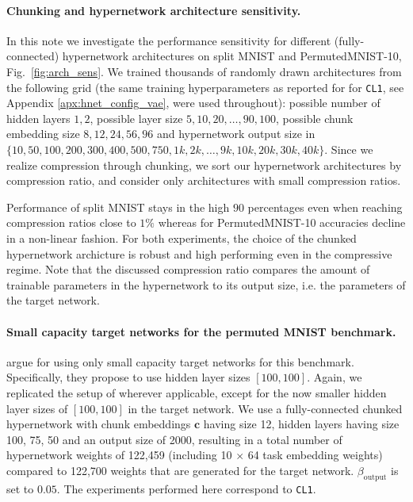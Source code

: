 \documentclass{article}
\begin{document}
\paragraph{Chunking and hypernetwork architecture sensitivity.} 
In this note we investigate the performance sensitivity for different (fully-connected) hypernetwork architectures on split MNIST and PermutedMNIST-10, Fig.~\ref{fig:arch_sens}. We trained thousands of randomly drawn architectures from the following grid (the same training hyperparameters as reported for for \texttt{CL1}, see Appendix \ref{apx:hnet_config_vae}, were used throughout): 
possible number of hidden layers $1,2$, possible layer size $5,10,20, \dots ,90,100$, possible chunk embedding size $8,12,24,56,96$ and hypernetwork output size in $\{10,50,100,200,300,400,500,750,1k,2k, \dots, 9k,10k,20k,30k,40k\}$. Since we realize compression through chunking, we sort our hypernetwork architectures by compression ratio, and consider only architectures with small compression ratios.

Performance of split MNIST stays in the high $90$ percentages even when reaching compression ratios close to $1\%$ whereas for PermutedMNIST-10 accuracies decline in a non-linear fashion. For both experiments, the choice of the chunked hypernetwork archicture is robust and high performing even in the compressive regime. Note that the discussed compression ratio compares the amount of trainable parameters in the hypernetwork to its output size, i.e. the parameters of the target network.

\paragraph{Small capacity target networks for the permuted MNIST benchmark.} \citet{improved:vcl} argue for using only small capacity target networks for this benchmark. Specifically, they propose to use hidden layer sizes $[100, 100]$. Again, we replicated the setup of \citet{van_de_ven_three_2019} wherever applicable, except for the now smaller hidden layer sizes of $[100, 100]$ in the target network. We use a fully-connected chunked hypernetwork with chunk embeddings $\mathbf{c}$ having size 12, hidden layers having size 100, 75, 50 and an output size of 2000, resulting in a total number of hypernetwork weights of 122,459 (including 10 $\times$ 64 task embedding weights) compared to 122,700 weights that are generated for the target network. $\beta_\text{output}$  is set to $0.05$. The experiments performed here correspond to \texttt{CL1}.
\end{document}
